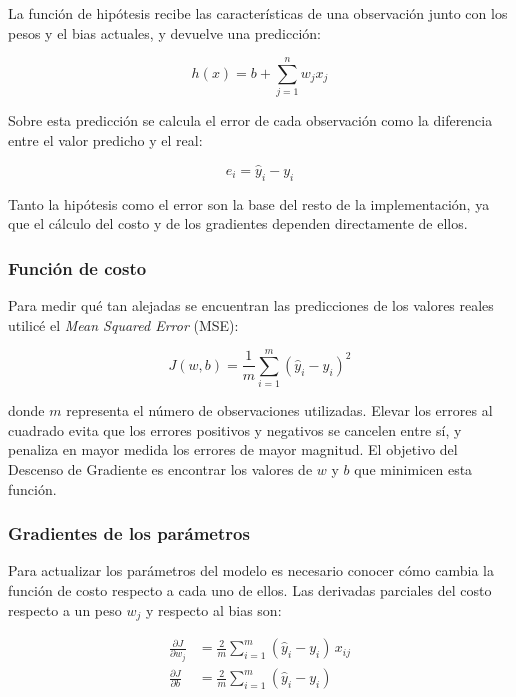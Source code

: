 \documentclass[a4paper,12pt,twocolumn]{report}
\begin{document}
La función de hipótesis recibe las características de una observación junto con los pesos y el bias actuales, y devuelve una predicción:

\begin{equation}
h(x) = b + \sum_{j=1}^{n} w_j x_j
\end{equation}

Sobre esta predicción se calcula el error de cada observación como la diferencia entre el valor predicho y el real:

\begin{equation}
e_i = \hat{y}_i - y_i
\end{equation}

Tanto la hipótesis como el error son la base del resto de la implementación, ya que el cálculo del costo y de los gradientes dependen directamente de ellos.

\subsubsection{Función de costo}

Para medir qué tan alejadas se encuentran las predicciones de los valores reales utilicé el \textit{Mean Squared Error} (MSE):

\begin{equation}
J(w, b) = \frac{1}{m}\sum_{i=1}^{m}\left(\hat{y}_i - y_i\right)^2
\end{equation}

donde $m$ representa el número de observaciones utilizadas. Elevar los errores al cuadrado evita que los errores positivos y negativos se cancelen entre sí, y penaliza en mayor medida los errores de mayor magnitud. El objetivo del Descenso de Gradiente es encontrar los valores de $w$ y $b$ que minimicen esta función.

\subsubsection{Gradientes de los parámetros}

Para actualizar los parámetros del modelo es necesario conocer cómo cambia la función de costo respecto a cada uno de ellos. Las derivadas parciales del costo respecto a un peso $w_j$ y respecto al bias son:

\begin{align}
\frac{\partial J}{\partial w_j} &= \frac{2}{m}\sum_{i=1}^{m}(\hat{y}_i - y_i)\, x_{ij} \\
\frac{\partial J}{\partial b} &= \frac{2}{m}\sum_{i=1}^{m}(\hat{y}_i - y_i)
\end{align}
\end{document}
